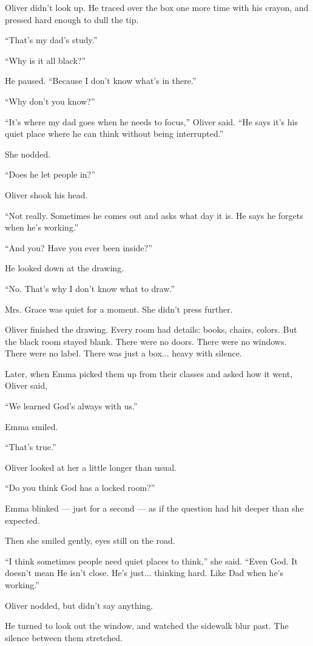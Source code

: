 Oliver didn’t look up. 
He traced over the box one more time with his crayon, and pressed hard enough to 
dull the tip.

``That’s my dad’s study.''

``Why is it all black?''

He paused. ``Because I don’t know what’s in there.''

``Why don’t you know?''

``It’s where my dad goes when he needs to focus,'' Oliver said. ``He says it’s his quiet place where 
he can think without being interrupted.''

She nodded.

``Does he let people in?''

Oliver shook his head.

``Not really. Sometimes he comes out and asks what day it is. He says he forgets when he’s working.''

``And you? Have you ever been inside?''

He looked down at the drawing.

``No. That's why I don't know what to draw.''

Mrs. Grace was quiet for a moment.  She didn’t press further.

Oliver finished the drawing. Every room had details: books, chairs, colors. 
But the black room stayed blank.  
There were no doors. 
There were no windows. 
There were no label. 
There was just a box...  heavy with silence.

Later, when Emma picked them up from their classes and asked how it went, Oliver said,

``We learned God’s always with us.''

Emma smiled.

``That’s true.''

Oliver looked at her a little longer than usual.

``Do you think God has a locked room?''

Emma blinked --- just for a second --- as if the question had hit deeper than she expected.

Then she smiled gently, eyes still on the road.

``I think sometimes people need quiet places to think,'' she said. ``Even God. It doesn’t mean 
He isn’t close. He's just... thinking hard. Like Dad when he’s working.''

Oliver nodded, but didn’t say anything.

He turned to look out the window, and watched the sidewalk blur past.  
The silence between them stretched.

